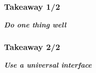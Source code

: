 \begin{frame}

\frametitle{Takeaway 1/2}

\begin{center}

\Large \textbf{\emph{Do one thing well}}

\end{center}

\end{frame}


\begin{frame}

\frametitle{Takeaway 2/2}

\begin{center}

\Large \textbf{\emph{Use a universal interface}}

\end{center}

\end{frame}
